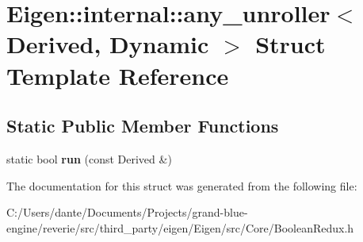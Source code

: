 \hypertarget{struct_eigen_1_1internal_1_1any__unroller_3_01_derived_00_01_dynamic_01_4}{}\section{Eigen\+::internal\+::any\+\_\+unroller$<$ Derived, Dynamic $>$ Struct Template Reference}
\label{struct_eigen_1_1internal_1_1any__unroller_3_01_derived_00_01_dynamic_01_4}
\subsection*{Static Public Member Functions}
\begin{DoxyCompactItemize}
\item 
\mbox{\label{struct_eigen_1_1internal_1_1any__unroller_3_01_derived_00_01_dynamic_01_4_a45692835ecbe96b0f30b59d2d20d61b5}} 
static bool {\bfseries run} (const Derived \&)
\end{DoxyCompactItemize}


The documentation for this struct was generated from the following file\+:\begin{DoxyCompactItemize}
\item 
C\+:/\+Users/dante/\+Documents/\+Projects/grand-\/blue-\/engine/reverie/src/third\+\_\+party/eigen/\+Eigen/src/\+Core/Boolean\+Redux.\+h\end{DoxyCompactItemize}
